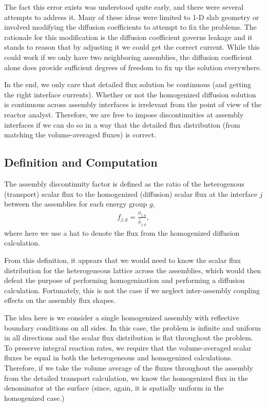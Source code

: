 The fact this error exists was understood quite early, and there were several attempts to address it. Many of these ideas were limited to 1-D slab geometry or involved modifying the diffusion coefficients to attempt to fix the problems. The rationale for this modification is the diffusion coefficient governs leakage and it stands to reason that by adjusting it we could get the correct current. While this could work if we only have two neighboring assemblies, the diffusion coefficient alone does provide sufficient degrees of freedom to fix up the solution everywhere.

In the end, we only care that detailed flux solution be continuous (and getting the right interface currents). Whether or not the homogenized diffusion solution is continuous across assembly interfaces is irrelevant from the point of view of the reactor analyst. Therefore, we are free to impose discontinuities at assembly interfaces if we can do so in a way that the detailed flux distribution (from matching the volume-averaged fluxes) is correct.




\subsection{Definition and Computation}

The assembly discontinuity factor is defined as the ratio of the heterogenous (transport) scalar flux to the homogenized (diffusion) scalar flux at the interface $j$ between the assemblies for each energy group $g$,
\begin{align}
  f_{j,g} = \frac{ \phi_{j,g} } { \widehat{\phi}_{j,g} },
\end{align}
where here we use a hat to denote the flux from the homogenized diffusion calculation.

From this definition, it appears that we would need to know the scalar flux distribution for the heterogeneous lattice across the assemblies, which would then defeat the purpose of performing homogenization and performing a diffusion calculation. Fortunately, this is not the case if we neglect inter-assembly coupling effects on the assembly flux shapes.

The idea here is we consider a single homogenized assembly with reflective boundary conditions on all sides. In this case, the problem is infinite and uniform in all directions and the scalar flux distribution is flat throughout the problem. To preserve integral reaction rates, we require that the volume-averaged scalar fluxes be equal in both the heterogeneous and homogenized calculations. Therefore, if we take the volume average of the fluxes throughout the assembly from the detailed transport calculation, we know the homogenized flux in the denominator at the surface (since, again, it is spatially uniform in the homogenized case.)

